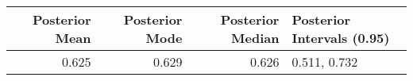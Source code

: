 \begin{tabular}{rrrl}
\toprule
Posterior Mean & Posterior Mode & Posterior Median & Posterior Intervals (0.95) \\
\midrule
0.625 & 0.629 & 0.626 & 0.511, 0.732 \\
\bottomrule
\end{tabular}
